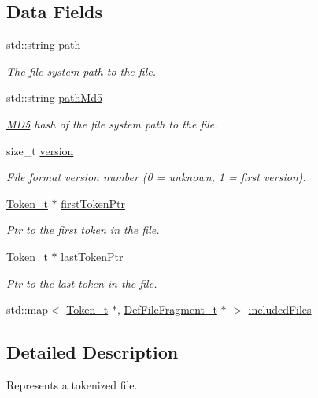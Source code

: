 \subsection*{Data Fields}
\begin{DoxyCompactItemize}
\item 
std\+::string \hyperlink{struct_def_file_fragment__t_a74e1e418da78f9240c2cbc97a6d6d86d}{path}
\begin{DoxyCompactList}\small\item\em The file system path to the file. \end{DoxyCompactList}\item 
std\+::string \hyperlink{struct_def_file_fragment__t_a1d4a46b98adb0d51baa6d7ba3236f232}{path\+Md5}
\begin{DoxyCompactList}\small\item\em \hyperlink{class_m_d5}{M\+D5} hash of the file system path to the file. \end{DoxyCompactList}\item 
size\+\_\+t \hyperlink{struct_def_file_fragment__t_a6e5fa90d7c9e2ced681794c157604ff4}{version}
\begin{DoxyCompactList}\small\item\em File format version number (0 = unknown, 1 = first version). \end{DoxyCompactList}\item 
\hyperlink{struct_token__t}{Token\+\_\+t} $\ast$ \hyperlink{struct_def_file_fragment__t_af79a81dc26230ae8c43e9916eda5c50b}{first\+Token\+Ptr}
\begin{DoxyCompactList}\small\item\em Ptr to the first token in the file. \end{DoxyCompactList}\item 
\hyperlink{struct_token__t}{Token\+\_\+t} $\ast$ \hyperlink{struct_def_file_fragment__t_a9f671dbcc9017db39f9b5549713ed86a}{last\+Token\+Ptr}
\begin{DoxyCompactList}\small\item\em Ptr to the last token in the file. \end{DoxyCompactList}\item 
std\+::map$<$ \hyperlink{struct_token__t}{Token\+\_\+t} $\ast$, \hyperlink{struct_def_file_fragment__t}{Def\+File\+Fragment\+\_\+t} $\ast$ $>$ \hyperlink{struct_def_file_fragment__t_a328166cab44b6183d1471356374f6171}{included\+Files}
\end{DoxyCompactItemize}


\subsection{Detailed Description}
Represents a tokenized file.

